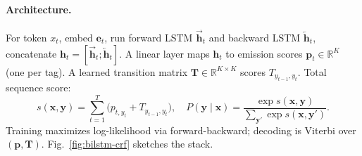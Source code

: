 \paragraph{Architecture.} For token $x_t$, embed $\mathbf{e}_t$, run forward LSTM $\overrightarrow{\mathbf{h}}_t$ and backward LSTM $\overleftarrow{\mathbf{h}}_t$, concatenate $\mathbf{h}_t=[\overrightarrow{\mathbf{h}}_t;\overleftarrow{\mathbf{h}}_t]$. A linear layer maps $\mathbf{h}_t$ to emission scores $\mathbf{p}_t\in\mathbb{R}^K$ (one per tag). A learned transition matrix $\mathbf{T}\in\mathbb{R}^{K\times K}$ scores $T_{y_{t-1},y_t}$. Total sequence score:
\begin{equation}
s(\mathbf{x},\mathbf{y})=\sum_{t=1}^{T}\big(p_{t,y_t}+T_{y_{t-1},y_t}\big),\quad P(\mathbf{y}\mid\mathbf{x})=\frac{\exp s(\mathbf{x},\mathbf{y})}{\sum_{\mathbf{y}'}\exp s(\mathbf{x},\mathbf{y}')}.
\label{eq:bilstm-crf-score}
\end{equation}
Training maximizes log-likelihood via forward-backward; decoding is Viterbi over $(\mathbf{p},\mathbf{T})$. Fig.~\ref{fig:bilstm-crf} sketches the stack.

